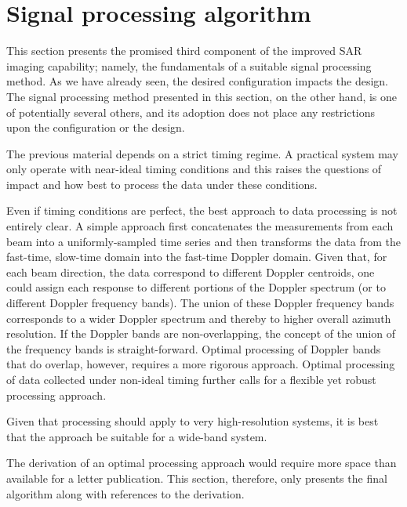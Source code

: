 \section{Signal processing algorithm}
This section presents the promised third component of the improved SAR imaging capability; namely, the fundamentals of a suitable signal processing method. As we have already seen, the desired configuration impacts the design. The signal processing method presented in this section, on the other hand, is one of potentially several others, and its adoption does not place any restrictions upon the configuration or the design.  
\par
The previous material depends on a strict timing regime. A practical system may only operate with near-ideal timing conditions and this raises the questions of impact and how best to process the data under these conditions. 
\par
Even if timing conditions are perfect, the best approach to data processing is not entirely clear. A simple approach first concatenates the measurements from each beam into a uniformly-sampled time series and then transforms the data from the fast-time, slow-time domain into the fast-time Doppler domain. Given that, for each beam direction, the data correspond to different Doppler centroids, one could assign each response to different portions of the Doppler spectrum (or to different Doppler frequency bands). The union of these Doppler frequency bands corresponds to a wider Doppler spectrum and thereby to higher overall azimuth resolution. If the Doppler bands are non-overlapping, the concept of the union of the frequency bands is straight-forward. Optimal processing of Doppler bands that do overlap, however, requires a more rigorous approach. Optimal processing of data collected under non-ideal timing further calls for a flexible yet robust processing approach.
\par
Given that processing should apply to very high-resolution systems, it is best that the approach be suitable for a wide-band system. 
\par
The derivation of an optimal processing approach would require more space than available for a letter publication. This section, therefore, only presents the final algorithm along with references to the derivation.
